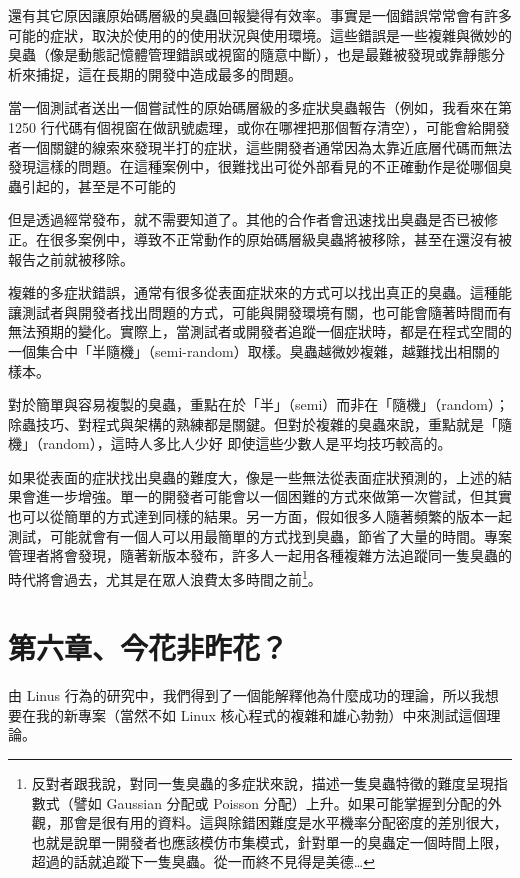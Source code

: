 \documentclass[12pt,]{article}
\makeatletter
\newcommand*{\shifttext}[2]{%
  \settowidth{\@tempdima}{#2}%
  \makebox[\@tempdima]{\hspace*{#1}#2}%
}
\makeatother
\begin{document}
還有其它原因讓原始碼層級的臭蟲回報變得有效率。事實是一個錯誤常常會有許多可能的症狀，取決於使用的的使用狀況與使用環境。這些錯誤是一些複雜與微妙的臭蟲（像是動態記憶體管理錯誤或視窗的隨意中斷），也是最難被發現或靠靜態分析來捕捉，這在長期的開發中造成最多的問題。

當一個測試者送出一個嘗試性的原始碼層級的多症狀臭蟲報告（例如，我看來在第
1250
行代碼有個視窗在做訊號處理，或你在哪裡把那個暫存清空），可能會給開發者一個關鍵的線索來發現半打的症狀，這些開發者通常因為太靠近底層代碼而無法發現這樣的問題。在這種案例中，很難找出可從外部看見的不正確動作是從哪個臭蟲引起的，甚至是不可能的
\shifttext{1pt}{---}\shifttext{-1pt}{---}
但是透過經常發布，就不需要知道了。其他的合作者會迅速找出臭蟲是否已被修正。在很多案例中，導致不正常動作的原始碼層級臭蟲將被移除，甚至在還沒有被報告之前就被移除。

複雜的多症狀錯誤，通常有很多從表面症狀來的方式可以找出真正的臭蟲。這種能讓測試者與開發者找出問題的方式，可能與開發環境有關，也可能會隨著時間而有無法預期的變化。實際上，當測試者或開發者追蹤一個症狀時，都是在程式空間的一個集合中「半隨機」（semi-random）取樣。臭蟲越微妙複雜，越難找出相關的樣本。

對於簡單與容易複製的臭蟲，重點在於「半」（semi）而非在「隨機」（random）；除蟲技巧、對程式與架構的熟練都是關鍵。但對於複雜的臭蟲來說，重點就是「隨機」（random），這時人多比人少好
\shifttext{1pt}{---}\shifttext{-1pt}{---} 即使這些少數人是平均技巧較高的。

如果從表面的症狀找出臭蟲的難度大，像是一些無法從表面症狀預測的，上述的結果會進一步增強。單一的開發者可能會以一個困難的方式來做第一次嘗試，但其實也可以從簡單的方式達到同樣的結果。另一方面，假如很多人隨著頻繁的版本一起測試，可能就會有一個人可以用最簡單的方式找到臭蟲，節省了大量的時間。專案管理者將會發現，隨著新版本發布，許多人一起用各種複雜方法追蹤同一隻臭蟲的時代將會過去，尤其是在眾人浪費太多時間之前\footnote{反對者跟我說，對同一隻臭蟲的多症狀來說，描述一隻臭蟲特徵的難度呈現指數式（譬如
  Gaussian 分配或 Poisson
  分配）上升。如果可能掌握到分配的外觀，那會是很有用的資料。這與除錯困難度是水平機率分配密度的差別很大，也就是說單一開發者也應該模仿市集模式，針對單一的臭蟲定一個時間上限，超過的話就追蹤下一隻臭蟲。從一而終不見得是美德\ldots{}}。

\newpage
\section{第六章、今花非昨花？}

由 Linus
行為的研究中，我們得到了一個能解釋他為什麼成功的理論，所以我想要在我的新專案（當然不如
Linux 核心程式的複雜和雄心勃勃）中來測試這個理論。
\end{document}
